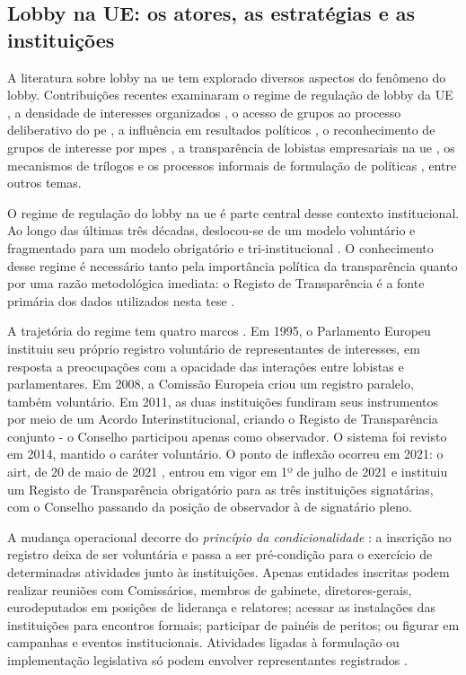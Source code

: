 \subsection{Lobby na UE: os atores, as estratégias e as instituições}
\label{section:lobbyUE}

A literatura sobre lobby na \acrshort{ue} tem explorado diversos aspectos do fenômeno do lobby. Contribuições recentes examinaram o regime de regulação de lobby da UE \cite{bunea2019regulating, bunea2018legitimacy}, a densidade de interesses organizados \cite{carroll2020cultural}, o acesso de grupos ao processo deliberativo do \acrshort{pe} \cite{coen2019legislative}, a influência em resultados políticos \cite{kluver2015legislative, marshall2010lobby}, o reconhecimento de grupos de interesse por \acrshort{mpe}s \cite{Ibenskas2021}, a transparência de lobistas empresariais na \acrshort{ue} \cite{naurin2007deliberation}, os mecanismos de trílogos e os processos informais de formulação de políticas \cite{brandsma2019transparency, leino2017search}, entre outros temas.

O regime de regulação do lobby na \acrshort{ue} é parte central desse contexto institucional. Ao longo das últimas três décadas, deslocou-se de um modelo voluntário e fragmentado para um modelo obrigatório e tri-institucional \cite{eprs2023register, ridao2025lobbying}. O conhecimento desse regime é necessário tanto pela importância política da transparência quanto por uma razão metodológica imediata: o Registo de Transparência é a fonte primária dos dados utilizados nesta tese \cite{eu_register_portal}.

A trajetória do regime tem quatro marcos \cite{eprs2023register}. Em 1995, o Parlamento Europeu instituiu seu próprio registro voluntário de representantes de interesses, em resposta a preocupações com a opacidade das interações entre lobistas e parlamentares. Em 2008, a Comissão Europeia criou um registro paralelo, também voluntário. Em 2011, as duas instituições fundiram seus instrumentos por meio de um Acordo Interinstitucional, criando o Registo de Transparência conjunto - o Conselho participou apenas como observador. O sistema foi revisto em 2014, mantido o caráter voluntário. O ponto de inflexão ocorreu em 2021: o \acrfull{airt}, de 20 de maio de 2021 \cite{airt2021}, entrou em vigor em 1º de julho de 2021 e instituiu um Registo de Transparência obrigatório para as três instituições signatárias, com o Conselho passando da posição de observador à de signatário pleno.

A mudança operacional decorre do \textit{princípio da condicionalidade} \cite[art.~5]{airt2021}: a inscrição no registro deixa de ser voluntária e passa a ser pré-condição para o exercício de determinadas atividades junto às instituições. Apenas entidades inscritas podem realizar reuniões com Comissários, membros de gabinete, diretores-gerais, eurodeputados em posições de liderança e relatores; acessar as instalações das instituições para encontros formais; participar de painéis de peritos; ou figurar em campanhas e eventos institucionais. Atividades ligadas à formulação ou implementação legislativa só podem envolver representantes registrados \cite{ridao2025lobbying}.

